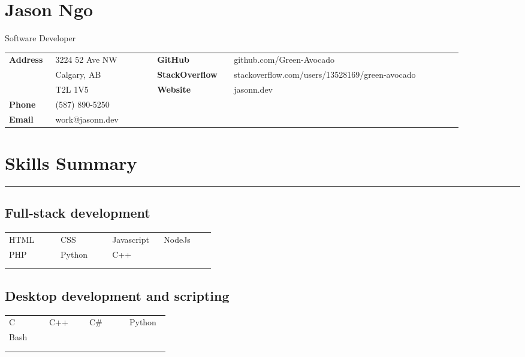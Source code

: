 \documentclass[letterpaper]{article}
\newcommand{\horizontalLine}{%
    \rule{\linewidth}{0.2pt}
    \vspace{1ex}
}
\begin{document}
    \section*{Jason Ngo}

    {\large
    Software Developer}

    {\small%
        \renewcommand{\arraystretch}{1.5}
        \begin{tabular}{p{0.08\linewidth} p{0.2\linewidth} p{0.15\linewidth} p{0.45\linewidth}}
            \\
            \textbf{Address} & 3224 52 Ave NW & \textbf{GitHub} & github.com/Green-Avocado \\
            & Calgary, AB & \textbf{StackOverflow} & stackoverflow.com/users/13528169/green-avocado \\
            & T2L 1V5 & \textbf{Website} & jasonn.dev \\
            \textbf{Phone} & (587) 890-5250 \\
            \textbf{Email} & work@jasonn.dev \\
        \end{tabular}
    }

    \section*{Skills Summary}

        \horizontalLine

        \subsection*{Full-stack development}

        \begin{tabular}{p{0.22\linewidth} p{0.22\linewidth} p{0.22\linewidth} p{0.22\linewidth}}
            \\
            HTML & CSS & Javascript & NodeJs \\
            PHP & Python & C++ \\
            \\
            \\
        \end{tabular}

        \subsection*{Desktop development and scripting}

        \begin{tabular}{p{0.22\linewidth} p{0.22\linewidth} p{0.22\linewidth} p{0.22\linewidth}}
            \\
            C & C++ & C\# & Python \\
            Bash \\
            \\
            \\
        \end{tabular}
\end{document}
